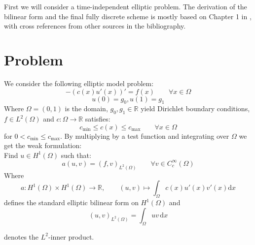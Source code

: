 First we will consider a time-independent elliptic problem. The derivation
of the bilinear form and the final fully discrete scheme is mostly based on
Chapter 1 in \cite{riviere2008}, with cross references from other sources 
in the bibliography.

\section{Problem}
We consider the following elliptic model problem:
\begin{equation}
    \label{eq:elliptic_pde}
    -(c(x)u'(x))' = f(x) \qquad \forall x\in \Omega
\end{equation} 
\begin{equation}
    \label{eq:elliptic_pde_bc}
    u(0) = g_0, u(1) = g_1
\end{equation}
Where $\Omega = (0,1)$ is the domain, $g_0, g_1 \in \mathbb{R}$ yield
Dirichlet boundary conditions, $f \in L^2(\Omega)$ and $c:\Omega \to \mathbb{R}$
satisfies:
\[
    c_{\min} \leq c(x) \leq c_{\max} \qquad \forall x\in \Omega
\]
for $0 < c_{\min} \leq c_{\max}$.
By multiplying by a test function and integrating over $\Omega$ we get the 
weak formulation: \\
Find $u \in H^1(\Omega)$ such that:
\begin{equation}
    a(u,v) = (f,v)_{L^2(\Omega)} \qquad \forall v \in C_c^{\infty}(\Omega)
\end{equation}
Where 
\[
    a:H^1(\Omega) \times H^1(\Omega) \to \mathbb{R}, \qquad (u,v) \mapsto \int_{\Omega} c(x)u'(x)v'(x) \text{d}x
\]  
defines the standard elliptic bilinear form on $H^1(\Omega)$ and 
\[
    (u,v)_{L^2(\Omega)} = \int_{\Omega} uv \,\text{d}x
\]

denotes the $L^2$-inner product.

